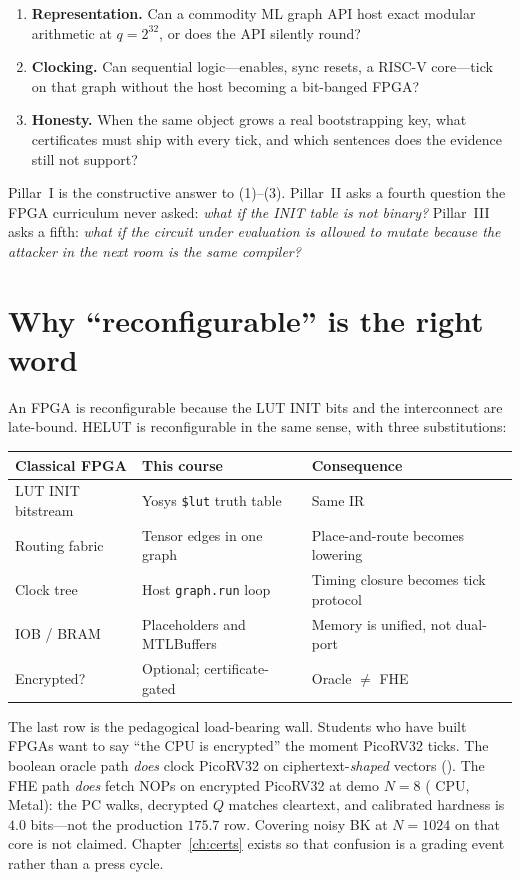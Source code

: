 \begin{enumerate}
  \item \textbf{Representation.}
        Can a commodity ML graph API host exact modular arithmetic at
        $q=2^{32}$, or does the API silently round?
  \item \textbf{Clocking.}
        Can sequential logic---enables, sync resets, a RISC-V core---tick
        on that graph without the host becoming a bit-banged FPGA?
  \item \textbf{Honesty.}
        When the same object grows a real bootstrapping key, what
        certificates must ship with every tick, and which sentences does the
        evidence still not support?
\end{enumerate}

Pillar~I is the constructive answer to (1)--(3).
Pillar~II asks a fourth question the FPGA curriculum never asked:
\emph{what if the INIT table is not binary?}
Pillar~III asks a fifth: \emph{what if the circuit under evaluation is allowed
to mutate because the attacker in the next room is the same compiler?}

\section{Why ``reconfigurable'' is the right word}

An FPGA is reconfigurable because the LUT INIT bits and the interconnect are
late-bound.
HELUT is reconfigurable in the same sense, with three substitutions:

\begin{center}
\begin{tabular}{@{}lll@{}}
\toprule
Classical FPGA & This course & Consequence \\
\midrule
LUT INIT bitstream & Yosys \texttt{\$lut} truth table & Same IR \\
Routing fabric & Tensor edges in one graph & Place-and-route becomes lowering \\
Clock tree & Host \texttt{graph.run} loop & Timing closure becomes tick protocol \\
IOB / BRAM & Placeholders and MTLBuffers & Memory is unified, not dual-port \\
Encrypted? & Optional; certificate-gated & Oracle $\neq$ FHE \\
\bottomrule
\end{tabular}
\end{center}

The last row is the pedagogical load-bearing wall.
Students who have built FPGAs want to say ``the CPU is encrypted'' the moment
PicoRV32 ticks.
The boolean oracle path \emph{does} clock PicoRV32 on ciphertext-\emph{shaped}
vectors ().
The FHE path \emph{does} fetch NOPs on encrypted PicoRV32 at demo $N{=}8$
( CPU,  Metal): the PC walks, decrypted $Q$ matches cleartext,
and calibrated hardness is $4.0$ bits---not the production $175.7$ row.
Covering noisy BK at $N{=}1024$ on that core is not claimed.
Chapter~\ref{ch:certs} exists so that confusion is a grading event rather than
a press cycle.

